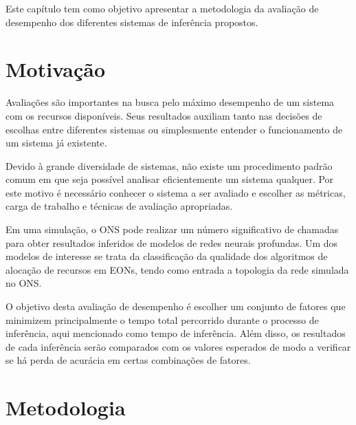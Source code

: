 Este capítulo tem como objetivo apresentar a metodologia da avaliação de desempenho dos diferentes sistemas de inferência propostos.


\section{Motivação}%

Avaliações são importantes na busca pelo máximo desempenho de um sistema com os recursos disponíveis. Seus resultados auxiliam tanto nas decisões de escolhas entre diferentes sistemas ou simplesmente entender o funcionamento de um sistema já existente.

Devido à grande diversidade de sistemas, não existe um procedimento padrão comum em que seja possível analisar eficientemente um sistema qualquer. Por este motivo é necessário conhecer o sistema a ser avaliado e escolher as métricas, carga de trabalho e técnicas de avaliação apropriadas. \cite{jain1991art}

Em uma simulação, o ONS pode realizar um número significativo de chamadas para obter resultados inferidos de modelos de redes neurais profundas. Um dos modelos de interesse se trata da classificação da qualidade dos algoritmos de alocação de recursos em EONs, tendo como entrada a topologia da rede simulada no ONS.

O objetivo desta avaliação de desempenho é escolher um conjunto de fatores que minimizem principalmente o tempo total percorrido durante o processo de inferência, aqui mencionado como tempo de inferência. Além disso, os resultados de cada inferência serão comparados com os valores esperados de modo a verificar se há perda de acurácia em certas combinações de fatores.


\section{Metodologia}%
\label{analysis-motivation}

